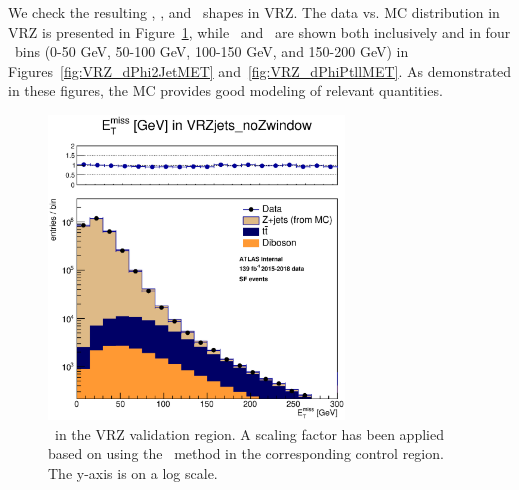 We check the resulting \MET, \mindphijm, and \dphiptllmet\ shapes in VRZ. The data vs. MC \MET distribution in VRZ is presented in Figure~\ref{fig:VRZ_MET}, while \mindphijm\ and \dphiptllmet\ are shown both inclusively and in four \MET\ bins (0-50 GeV, 50-100 GeV, 100-150 GeV, and 150-200 GeV) in Figures~\ref{fig:VRZ_dPhi2JetMET} and~\ref{fig:VRZ_dPhiPtllMET}. As demonstrated in these figures, the MC provides good modeling of relevant quantities.

\begin{figure}[htbp]
\centering
\includegraphics[width=0.7\textwidth]{Images/SUSY/reweight_Ptll_all_SF_met_Et_VRZ.eps}
\caption{\MET\ in the VRZ validation region. A scaling factor has been applied based on using the \mindphijm\ method in the corresponding control region. The y-axis is on a log scale.}
\label{fig:VRZ_MET}
\end{figure}

